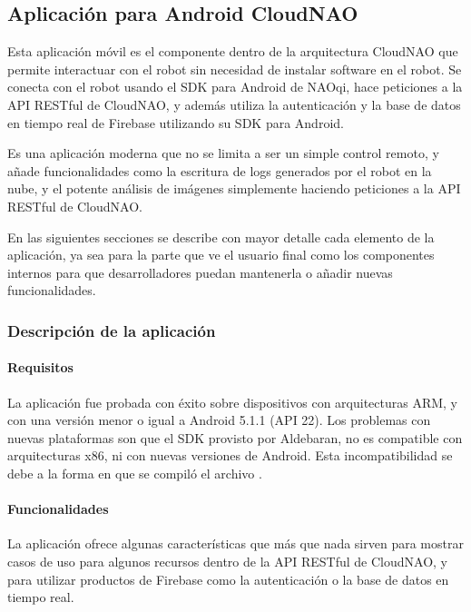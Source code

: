 \subsection{Aplicación para Android CloudNAO}
\label{\detokenize{introduction:welcome-to-cloudnao-android-s-documentation}}
Esta aplicación móvil es el componente dentro de la arquitectura CloudNAO
que permite interactuar con el robot sin necesidad de instalar software en el
robot. Se conecta con el robot usando el SDK para Android de NAOqi, hace peticiones
a la API RESTful de CloudNAO, y además utiliza la autenticación
y la base de datos en tiempo real de Firebase utilizando su SDK para Android.

Es una aplicación moderna que no se limita a ser un simple control remoto, y
añade funcionalidades como la escritura de logs generados por el robot en la nube,
y el potente análisis de imágenes simplemente haciendo peticiones a la API
RESTful de CloudNAO.

En las siguientes secciones se describe con mayor detalle cada elemento de la
aplicación, ya sea para la parte que ve el usuario final como los componentes
internos para que desarrolladores puedan mantenerla o añadir nuevas
funcionalidades.

\subsubsection{Descripción de la aplicación}
\paragraph{Requisitos}
\label{\detokenize{users_docs:requisitos}}
La aplicación fue probada con éxito sobre dispositivos con arquitecturas ARM,
y con una versión menor o igual a Android 5.1.1 (API 22). Los problemas con
nuevas plataformas son que el SDK provisto por Aldebaran, no es compatible con
arquitecturas x86, ni con nuevas versiones de Android. Esta incompatibilidad
se debe a la forma en que se compiló el archivo
.


\paragraph{Funcionalidades}
\label{\detokenize{users_docs:fucionalidades}}
La aplicación ofrece algunas características que más que nada sirven para
mostrar casos de uso para algunos recursos dentro de la API RESTful
de CloudNAO, y para utilizar productos de Firebase como la autenticación
o la base de datos en tiempo real.

